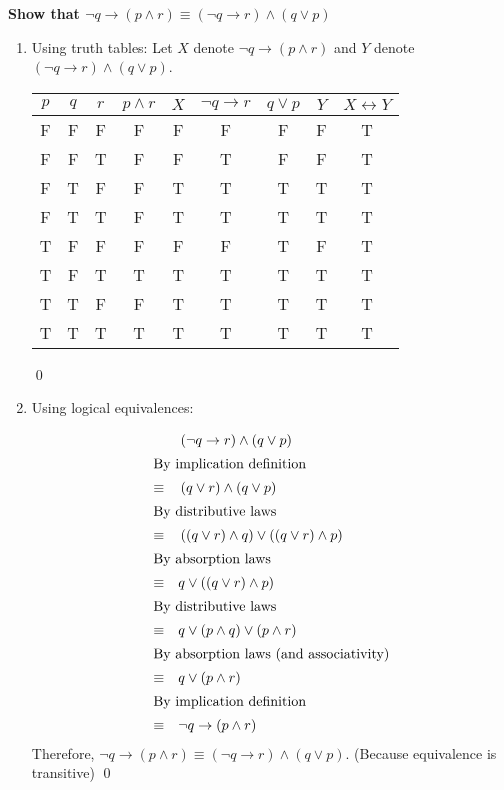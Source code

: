 \documentclass[letterpaper, 12pt]{article}
\begin{document}
\noindent\textbf{Show that $\lnot q \rightarrow \left( p \land r\right) \equiv \left(\lnot q \rightarrow r\right) \land \left(q \lor p \right)$}
\begin{enumerate}
    \item Using truth tables: Let $X$ denote $\lnot q \rightarrow \left( p \land r \right)$ and $Y$ denote $\left( \lnot q \rightarrow r \right) \land \left( q\lor p\right)$.
    
    \begin{tabular}{c|c|c||c|c|c|c|c|c}
        $p$ &   $q$ &   $r$ &   $p \land r$ &   $X$  &   $\lnot q\rightarrow r$ &   $q \lor p$  &   $Y$   &  $X \leftrightarrow Y$ \\ \hline
        F   &   F   &   F   &   F   &   F   &   F   &   F   &   F   &   T   \\
        F   &   F   &   T   &   F   &   F   &   T   &   F   &   F   &   T   \\
        F   &   T   &   F   &   F   &   T   &   T   &   T   &   T   &   T   \\
        F   &   T   &   T   &   F   &   T   &   T   &   T   &   T   &   T   \\
        T   &   F   &   F   &   F   &   F   &   F   &   T   &   F   &   T   \\
        T   &   F   &   T   &   T   &   T   &   T   &   T   &   T   &   T   \\
        T   &   T   &   F   &   F   &   T   &   T   &   T   &   T   &   T   \\
        T   &   T   &   T   &   T   &   T   &   T   &   T   &   T   &   T
    \end{tabular} 
    
    \qed
    
    \item Using logical equivalences:
    
    \begin{align*}
                &\quad \left(\lnot q \rightarrow r\right) \land \left( q \lor p\right)\\
    \shortintertext{By implication definition}
        \equiv  &\quad \left( q \lor r \right) \land \left( q \lor p\right)\\
    \shortintertext{By distributive laws}
        \equiv  &\quad \left(\left( q \lor r\right) \land q\right) \lor \left(\left(q \lor r \right) \land p \right)\\
    \shortintertext{By absorption laws}
        \equiv  &\quad q \lor \left(\left(q \lor r \right) \land p \right)\\
    \shortintertext{By distributive laws}
        \equiv  &\quad q \lor \left( p \land q \right) \lor \left(p\land r \right)\\
    \shortintertext{By absorption laws (and associativity)}
        \equiv  &\quad q \lor \left( p \land r \right)\\
    \shortintertext{By implication definition}
        \equiv  &\quad \lnot q \rightarrow \left(p\land r\right)
    \end{align*}
    Therefore, $\lnot q \rightarrow \left( p \land r\right) \equiv \left(\lnot q \rightarrow r\right) \land \left(q \lor p \right)$. (Because equivalence is transitive) \qed
\end{enumerate}
\end{document}
